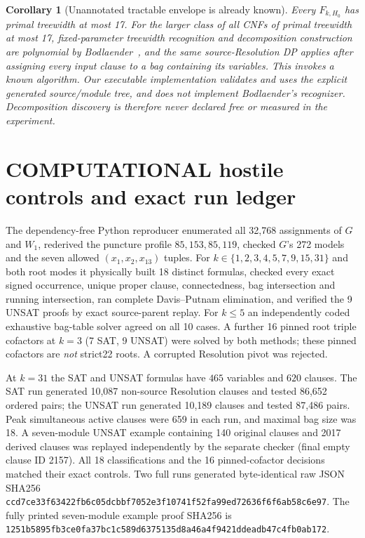 \documentclass[11pt]{article}
\newtheorem{corollary}[theorem]{Corollary}
\begin{document}
\begin{corollary}[Unannotated tractable envelope is already known]
Every $F_{k,H_0}$ has primal treewidth at most 17. For the larger class of \emph{all} CNFs of primal treewidth at most 17, fixed-parameter treewidth recognition and decomposition construction are polynomial by Bodlaender~\cite{bodlaender}, and the same source-Resolution DP applies after assigning every input clause to a bag containing its variables. This invokes a \emph{known} algorithm. Our executable implementation validates and uses the explicit generated source/module tree, and does not implement Bodlaender's recognizer. Decomposition discovery is therefore never declared free or measured in the experiment.
\end{corollary}

\section{COMPUTATIONAL hostile controls and exact run ledger}
The dependency-free Python reproducer enumerated all 32,768 assignments of $G$ and $W_1$, rederived the puncture profile $85,153,85,119$, checked $G$'s 272 models and the seven allowed $(x_1,x_2,x_{13})$ tuples. For $k\in\{1,2,3,4,5,7,9,15,31\}$ and both root modes it physically built 18 distinct formulas, checked every exact signed occurrence, unique proper clause, connectedness, bag intersection and running intersection, ran complete Davis--Putnam elimination, and verified the 9 UNSAT proofs by exact source-parent replay. For $k\le5$ an independently coded exhaustive bag-table solver agreed on all 10 cases. A further 16 pinned root triple cofactors at $k=3$ (7 SAT, 9 UNSAT) were solved by both methods; these pinned cofactors are \emph{not} strict22 roots. A corrupted Resolution pivot was rejected.

At $k=31$ the SAT and UNSAT formulas have $465$ variables and $620$ clauses. The SAT run generated 10,087 non-source Resolution clauses and tested 86,652 ordered pairs; the UNSAT run generated 10,189 clauses and tested 87,486 pairs. Peak simultaneous active clauses were 659 in each run, and maximal bag size was 18. A seven-module UNSAT example containing 140 original clauses and 2017 derived clauses was replayed independently by the separate checker (final empty clause ID 2157). All 18 classifications and the 16 pinned-cofactor decisions matched their exact controls. Two full runs generated byte-identical raw JSON SHA256 \texttt{ccd7ce33f63422fb6c05dcbbf7052e3f10741f52fa99ed72636f6f6ab58c6e97}. The fully printed seven-module example proof SHA256 is \texttt{1251b5895fb3ce0fa37bc1c589d6375135d8a46a4f9421ddeadb47c4fb0ab172}.
\end{document}
